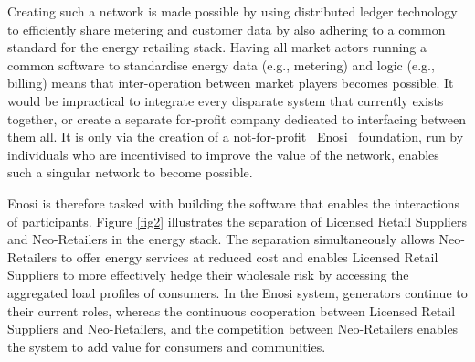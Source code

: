 \documentclass[a4paper,12pt,reqno]{amsart}
\theoremstyle{definition}
\begin{document}
\enlargethispage{-1\baselineskip}
% 
% 

Creating such a network is made possible by using distributed ledger technology to efficiently share metering and customer data by also adhering to a common standard for the energy retailing stack. Having all market actors running a common software to standardise energy data (e.g., metering) and logic (e.g., billing) means that inter-operation between market players becomes possible. It would be impractical to integrate every disparate system that currently exists together, or create a separate for-profit company dedicated to interfacing between them all. It is only via the creation of a not-for-profit \textemdash\, Enosi \textemdash\, foundation, run by individuals who are incentivised to improve the value of the network, enables such a singular network to become possible. 
% 
% 
% 
% 

Enosi is therefore tasked with building the software that enables the interactions of participants. Figure \ref{fig2} illustrates the separation of Licensed Retail Suppliers and Neo-Retailers in the energy stack. The separation simultaneously allows Neo-Retailers to offer energy services at reduced cost and enables Licensed Retail Suppliers to more effectively hedge their wholesale risk by accessing the aggregated load profiles of consumers. In the Enosi system, generators continue to their current roles, whereas the continuous cooperation between Licensed Retail Suppliers and Neo-Retailers, and the competition between Neo-Retailers enables the system to add value for consumers and communities. 
% 
% 
% 
%
\end{document}
